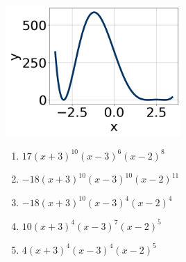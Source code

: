 \documentclass[14pt]{extbook}
\begin{document}
\begin{enumerate}
{\begin{center}
    \includegraphics[width=0.5\textwidth]{../Figures/polyGraphToFunctionCopyC.png}
\end{center}
\begin{enumerate}[label=\Alph*.]
\item \( 17(x + 3)^{10} (x - 3)^{6} (x - 2)^{8} \)
\item \( -18(x + 3)^{10} (x - 3)^{10} (x - 2)^{11} \)
\item \( -18(x + 3)^{10} (x - 3)^{4} (x - 2)^{4} \)
\item \( 10(x + 3)^{4} (x - 3)^{7} (x - 2)^{5} \)
\item \( 4(x + 3)^{4} (x - 3)^{4} (x - 2)^{5} \)


\end{enumerate}}
\end{enumerate}
\end{document}
